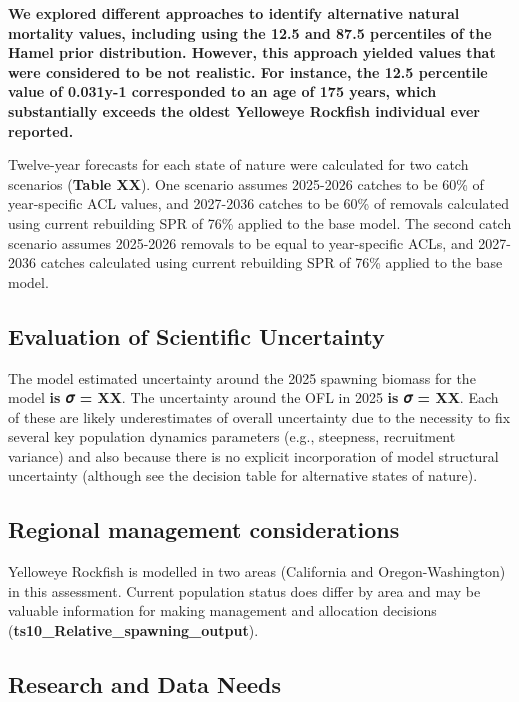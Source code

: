 \documentclass[
]{scrartcl}
\begin{document}
\textbf{We explored different approaches to identify alternative natural
mortality values, including using the 12.5 and 87.5 percentiles of the
Hamel prior distribution. However, this approach yielded values that
were considered to be not realistic. For instance, the 12.5 percentile
value of 0.031y-1 corresponded to an age of 175 years, which
substantially exceeds the oldest Yelloweye Rockfish individual ever
reported.}

Twelve-year forecasts for each state of nature were calculated for two
catch scenarios (\textbf{Table XX}). One scenario assumes 2025-2026
catches to be 60\% of year-specific ACL values, and 2027-2036 catches to
be 60\% of removals calculated using current rebuilding SPR of 76\%
applied to the base model. The second catch scenario assumes 2025-2026
removals to be equal to year-specific ACLs, and 2027-2036 catches
calculated using current rebuilding SPR of 76\% applied to the base
model.

\subsection{Evaluation of Scientific
Uncertainty}\label{evaluation-of-scientific-uncertainty}

The model estimated uncertainty around the 2025 spawning biomass for the
model \textbf{is 𝜎 = XX}. The uncertainty around the OFL in 2025
\textbf{is 𝜎 = XX}. Each of these are likely underestimates of overall
uncertainty due to the necessity to fix several key population dynamics
parameters (e.g., steepness, recruitment variance) and also because
there is no explicit incorporation of model structural uncertainty
(although see the decision table for alternative states of nature).

\subsection{Regional management
considerations}\label{regional-management-considerations}

Yelloweye Rockfish is modelled in two areas (California and
Oregon-Washington) in this assessment. Current population status does
differ by area and may be valuable information for making management and
allocation decisions (\textbf{ts10\_Relative\_spawning\_output}).

\subsection{Research and Data Needs}\label{research-and-data-needs-1}
\end{document}
